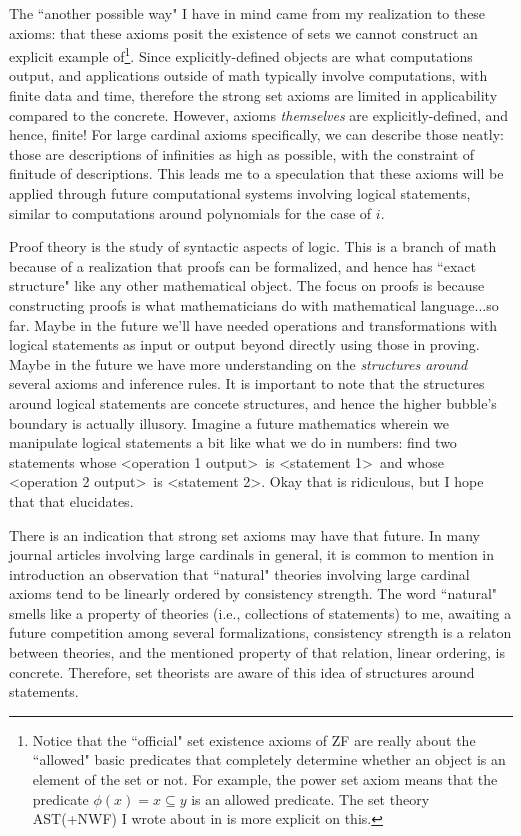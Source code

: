 \documentclass{article}
\theoremstyle{plain}
\begin{document}
The ``another possible way" I have in mind came from my realization to these axioms: that these axioms posit the existence of sets we cannot construct an explicit example of\footnote{Notice that the ``official" set existence axioms of \textsf{ZF} are really about the ``allowed" basic predicates that completely determine whether an object is an element of the set or not. For example, the power set axiom means that the predicate $\phi(x) = x \subseteq y$ is an allowed predicate. The set theory \textsf{AST(+NWF)} I wrote about in \cite{astnwf} is more explicit on this.}. Since explicitly-defined objects are what computations output, and applications outside of math typically involve computations, with finite data and time, therefore the strong set axioms are limited in applicability compared to the concrete. However, axioms \textit{themselves} are explicitly-defined, and hence, finite! For large cardinal axioms specifically, we can describe those neatly: those are descriptions of infinities as high as possible, with the constraint of finitude of descriptions. This leads me to a speculation that these axioms will be applied through future computational systems involving logical statements, similar to computations around polynomials for the case of $i$.

Proof theory is the study of syntactic aspects of logic. This is a branch of math because of a realization that proofs can be formalized, and hence has ``exact structure" like any other mathematical object. The focus on proofs is because constructing proofs is what mathematicians do with mathematical language...so far. Maybe in the future we'll have needed operations and transformations with logical statements as input or output beyond directly using those in proving. Maybe in the future we have more understanding on the \textit{structures around} several axioms and inference rules. It is important to note that the structures around logical statements are concete structures, and hence the higher bubble's boundary is actually illusory. Imagine a future mathematics wherein we manipulate logical statements a bit like what we do in numbers: find two statements whose \textless operation 1 output\textgreater\ is \textless statement 1\textgreater\ and whose \textless operation 2 output\textgreater\ is \textless statement 2\textgreater. Okay that is ridiculous, but I hope that that elucidates.

There is an indication that strong set axioms may have that future. In many journal articles involving large cardinals in general, it is common to mention in introduction an observation that ``natural" theories involving large cardinal axioms tend to be linearly ordered by consistency strength\cite{hamkins2025}. The word ``natural" smells like a property of theories (i.e., collections of statements) to me, awaiting a future competition among several formalizations, consistency strength is a relaton between theories, and the mentioned property of that relation, linear ordering, is concrete. Therefore, set theorists are aware of this idea of structures around statements.
\end{document}
